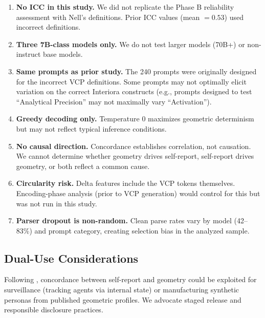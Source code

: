 \documentclass[11pt,a4paper]{article}
\begin{document}
\begin{enumerate}
    \item \textbf{No ICC in this study.} We did not replicate the Phase B reliability assessment with Nell's definitions. Prior ICC values (mean $= 0.53$) used incorrect definitions.

    \item \textbf{Three 7B-class models only.} We do not test larger models (70B+) or non-instruct base models.

    \item \textbf{Same prompts as prior study.} The 240 prompts were originally designed for the incorrect VCP definitions. Some prompts may not optimally elicit variation on the correct Interiora constructs (e.g., prompts designed to test ``Analytical Precision'' may not maximally vary ``Activation'').

    \item \textbf{Greedy decoding only.} Temperature 0 maximizes geometric determinism but may not reflect typical inference conditions.

    \item \textbf{No causal direction.} Concordance establishes correlation, not causation. We cannot determine whether geometry drives self-report, self-report drives geometry, or both reflect a common cause.

    \item \textbf{Circularity risk.} Delta features include the VCP tokens themselves. Encoding-phase analysis (prior to VCP generation) would control for this but was not run in this study.

    \item \textbf{Parser dropout is non-random.} Clean parse rates vary by model (42--83\%) and prompt category, creating selection bias in the analyzed sample.
\end{enumerate}

\subsection{Dual-Use Considerations}

Following \citet{watson2025interiora}, concordance between self-report and geometry could be exploited for surveillance (tracking agents via internal state) or manufacturing synthetic personas from published geometric profiles. We advocate staged release and responsible disclosure practices.

\end{document}
